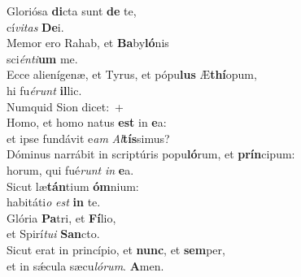 \evenverse Gloriósa \textbf{di}cta sunt \textbf{de} te,~\*\\
\evenverse cí\textit{vi}\textit{tas} \textbf{De}i.\\
\oddverse Memor ero Rahab, et \textbf{Ba}by\textbf{ló}nis~\*\\
\oddverse sci\textit{én}\textit{ti}\textbf{um} me.\\
\evenverse Ecce alienígenæ, et Tyrus, et pópu\textbf{lus} Æ\textbf{thí}opum,~\*\\
\evenverse hi fu\textit{é}\textit{runt} \textbf{il}lic.\\
\oddverse Numquid Sion dicet:~+\\
\oddverse  Homo, et homo natus \textbf{est} in \textbf{e}a:~\*\\
\oddverse et ipse fundávit e\textit{am} \textit{Al}\textbf{tís}simus?\\
\evenverse Dóminus narrábit in scriptúris popu\textbf{ló}rum, et \textbf{prín}cipum:~\*\\
\evenverse horum, qui fué\textit{runt} \textit{in} \textbf{e}a.\\
\oddverse Sicut læ\textbf{tán}tium \textbf{óm}nium:~\*\\
\oddverse habitáti\textit{o} \textit{est} \textbf{in} te.\\
\evenverse Glória \textbf{Pa}tri, et \textbf{Fí}lio,~\*\\
\evenverse et Spirí\textit{tu}\textit{i} \textbf{San}cto.\\
\oddverse Sicut erat in princípio, et \textbf{nunc}, et \textbf{sem}per,~\*\\
\oddverse et in sǽcula sæcu\textit{ló}\textit{rum}. \textbf{A}men.\\
